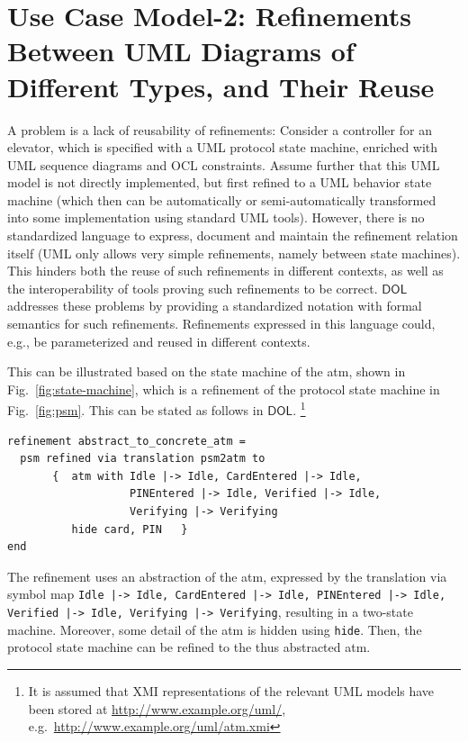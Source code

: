 \documentclass[10pt,fleqn,final]{scrreprt}
\newcommand*{\syntax}[1]{\texttt{#1}}
\newcommand*{\DOL}{\ensuremath{\mathsf{DOL}}\xspace}
\newenvironment{definitions}[0]{\medskip }{}
\newcommand{\uml}[1]{\textsf{#1}}
\begin{document}
\begin{definitions}
\section{Use Case Model-2: Refinements Between UML Diagrams of Different Types, and Their Reuse}
\label{model-2}

A problem is a lack of reusability of refinements: Consider a controller for an elevator, which is specified with a UML protocol state machine, enriched with UML 
sequence diagrams and OCL constraints. Assume further that this UML model is not directly implemented, but first refined to a UML behavior state machine (which then 
can be automatically or semi-automatically transformed into some implementation using standard UML tools). However, there is no standardized language to 
express, document and maintain the refinement relation itself (UML only allows very simple refinements, namely between state machines). This hinders both the 
reuse of such refinements in different contexts, as well as the interoperability of tools proving such refinements to be correct. \DOL  
addresses these problems by providing a standardized notation with formal semantics for such refinements. Refinements expressed in this language could, e.g., be 
parameterized and reused in different contexts.

 This can be illustrated based on the state
machine of the \uml{atm}, shown in Fig.~\ref{fig:state-machine}, which is a  
refinement of the protocol state machine in Fig.~\ref{fig:psm}. This can be stated as follows in \DOL. 
\footnote{  It is assumed that XMI representations of the relevant UML models have been 
stored at \url{http://www.example.org/uml/},
e.g.\ \url{http://www.example.org/uml/atm.xmi} } 


\begin{lstlisting}[basicstyle=\ttfamily,language=dolText,morekeywords={props,ObjectProperty,Class,DisjointUnionOf,SubClassOf,Characteristics,Transitive,Asymmetric,SubPropertyOf,DisjointClasses,EquivalentTo,inverse,only,forall,iff,if,or,exists,distributed,refinement,library,via},escapechar=@,mathescape]
refinement abstract_to_concrete_atm =
  psm refined via translation psm2atm to 
       {  atm with Idle |-> Idle, CardEntered |-> Idle, 
                   PINEntered |-> Idle, Verified |-> Idle, 
                   Verifying |-> Verifying 
          hide card, PIN   }
end
\end{lstlisting}

The refinement uses an abstraction of the \uml{atm}, expressed by the
translation via symbol map \texttt{Idle |-> Idle, CardEntered |-> Idle, PINEntered |-> Idle, Verified |-> Idle, Verifying |-> Verifying}, resulting in a two-state machine. Moreover, some detail of the \uml{atm} is hidden using
\syntax{hide}. Then, the protocol state machine can be refined to
the thus abstracted \uml{atm}.


\end{definitions}
\end{document}
